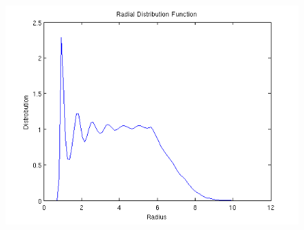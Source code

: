 \documentclass[10pt,a4paper]{article}
\begin{document}
\begin{figure}
	\centering
	\includegraphics[width=0.8\linewidth]{raddistfunc2}
	\caption[Pressure of the system ]{}
	\label{fig:raddistfunc2}
\end{figure}
 
\end{document}
